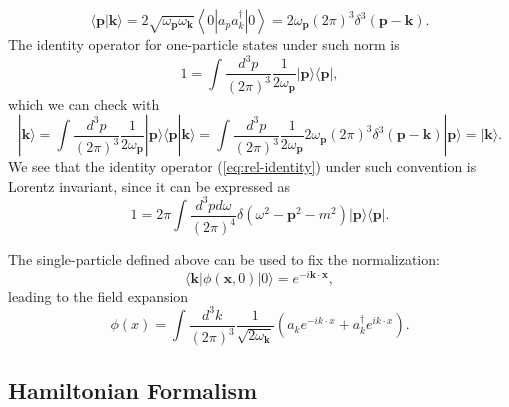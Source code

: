 \documentclass[aps,prb,superscriptaddress,nofootinbib]{revtex4}
\begin{document}
\begin{equation}
	\langle\bm{p}|\bm{k}\rangle 
	= 2\sqrt{\omega_{\bm p} \omega_{\bm k}}\left\langle 0\left|a_{p} a_{k}^{\dagger}\right| 0\right\rangle
	= 2 \omega_{\bm p}(2\pi)^{3} \delta^{3}(\bm{p}-\bm{k}).
\end{equation}
The identity operator for one-particle states under such norm is
\begin{equation}
	1=\int \frac{d^{3} p}{(2\pi)^{3}} \frac{1}{2\omega_{\bm p}}|\bm{p}\rangle\langle\bm{p}|, \label{eq:rel-identity}
\end{equation}
which we can check with
\begin{equation*}
	|\bm{k}\rangle
	=\int \frac{d^{3} p}{(2\pi)^{3}} \frac{1}{2\omega_{\bm p}}|\bm{p}\rangle\langle\bm{p}|\bm{k}\rangle
	=\int \frac{d^{3} p}{(2\pi)^{3}} \frac{1}{2\omega_{\bm p}} 2\omega_{\bm p}(2\pi)^3 \delta^3(\bm{p}-\bm{k})|\bm{p}\rangle
	=|\bm{k}\rangle.
\end{equation*}
We see that the identity operator (\ref{eq:rel-identity}) under such convention is Lorentz invariant, since it can be expressed as
\begin{equation}
	1 = 2\pi \int \frac{d^{3} p d\omega}{(2\pi)^{4}} \delta(\omega^2-{\bm{p}}^2-m^2) |\bm p\rangle\langle \bm p|.
\end{equation}

The single-particle defined above can be used to fix the normalization:
\begin{equation}
	\langle \bm k|\phi(\bm x,0)|0\rangle = e^{-i \bm k\cdot \bm x},
\end{equation}
leading to the field expansion
\begin{equation}
	\phi(x)
	=\int \frac{d^{3} k}{(2\pi)^{3}} \frac{1}{\sqrt{2\omega_{\bm k}}}\left(a_k 
		e^{-i k \cdot x}+a_k^{\dagger} e^{i k \cdot x}\right).
\end{equation}




\subsection{Hamiltonian Formalism}
\end{document}
